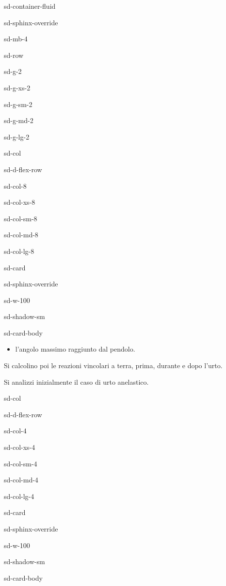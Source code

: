 \documentclass[letterpaper,10pt,italian]{jupyterBook}
\begin{document}
\begin{sphinxuseclass}{sd-container-fluid}
\begin{sphinxuseclass}{sd-sphinx-override}
\begin{sphinxuseclass}{sd-mb-4}
\begin{sphinxuseclass}{sd-row}
\begin{sphinxuseclass}{sd-g-2}
\begin{sphinxuseclass}{sd-g-xs-2}
\begin{sphinxuseclass}{sd-g-sm-2}
\begin{sphinxuseclass}{sd-g-md-2}
\begin{sphinxuseclass}{sd-g-lg-2}
\begin{sphinxuseclass}{sd-col}
\begin{sphinxuseclass}{sd-d-flex-row}
\begin{sphinxuseclass}{sd-col-8}
\begin{sphinxuseclass}{sd-col-xs-8}
\begin{sphinxuseclass}{sd-col-sm-8}
\begin{sphinxuseclass}{sd-col-md-8}
\begin{sphinxuseclass}{sd-col-lg-8}
\begin{sphinxuseclass}{sd-card}
\begin{sphinxuseclass}{sd-sphinx-override}
\begin{sphinxuseclass}{sd-w-100}
\begin{sphinxuseclass}{sd-shadow-sm}
\begin{sphinxuseclass}{sd-card-body}
\begin{itemize}
\item {} 
\sphinxAtStartPar
l’angolo massimo raggiunto dal pendolo.

\end{itemize}

\sphinxAtStartPar
Si calcolino poi le reazioni vincolari a terra, prima, durante e dopo l’urto.

\sphinxAtStartPar
Si analizzi inizialmente il caso di urto anelastico.

\end{sphinxuseclass}
\end{sphinxuseclass}
\end{sphinxuseclass}
\end{sphinxuseclass}
\end{sphinxuseclass}
\end{sphinxuseclass}
\end{sphinxuseclass}
\end{sphinxuseclass}
\end{sphinxuseclass}
\end{sphinxuseclass}
\end{sphinxuseclass}
\end{sphinxuseclass}
\begin{sphinxuseclass}{sd-col}
\begin{sphinxuseclass}{sd-d-flex-row}
\begin{sphinxuseclass}{sd-col-4}
\begin{sphinxuseclass}{sd-col-xs-4}
\begin{sphinxuseclass}{sd-col-sm-4}
\begin{sphinxuseclass}{sd-col-md-4}
\begin{sphinxuseclass}{sd-col-lg-4}
\begin{sphinxuseclass}{sd-card}
\begin{sphinxuseclass}{sd-sphinx-override}
\begin{sphinxuseclass}{sd-w-100}
\begin{sphinxuseclass}{sd-shadow-sm}
\begin{sphinxuseclass}{sd-card-body}
\sphinxAtStartPar

\end{sphinxuseclass}
\end{sphinxuseclass}
\end{sphinxuseclass}
\end{sphinxuseclass}
\end{sphinxuseclass}
\end{sphinxuseclass}
\end{sphinxuseclass}
\end{sphinxuseclass}
\end{sphinxuseclass}
\end{sphinxuseclass}
\end{sphinxuseclass}
\end{sphinxuseclass}
\end{sphinxuseclass}
\end{sphinxuseclass}
\end{sphinxuseclass}
\end{sphinxuseclass}
\end{sphinxuseclass}
\end{sphinxuseclass}
\end{sphinxuseclass}
\end{sphinxuseclass}
\end{sphinxuseclass}
\end{document}
